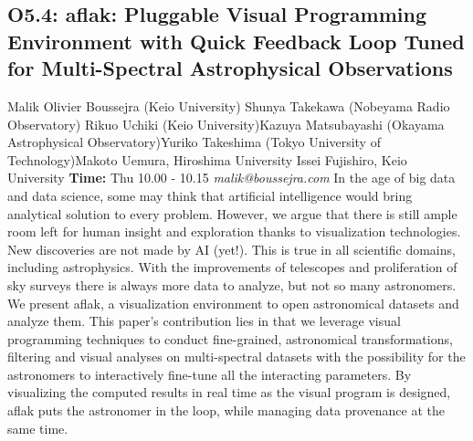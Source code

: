 \documentclass{report}
\begin{document}
\subsection*{O5.4: aflak: Pluggable Visual Programming Environment with Quick Feedback Loop Tuned for Multi-Spectral Astrophysical Observations}
\bigskip
Malik Olivier Boussejra (Keio University) \newline Shunya Takekawa (Nobeyama Radio Observatory) \newline  Rikuo Uchiki (Keio University)\newline  Kazuya Matsubayashi (Okayama Astrophysical Observatory)\newline Yuriko Takeshima (Tokyo University of Technology)\newline  Makoto Uemura, Hiroshima University
Issei Fujishiro, Keio University\newline\newline
{\bf Time:} Thu 10.00 - 10.15\newline
\newline
{\it malik@boussejra.com}\newline
\newline\newline
In the age of big data and data science, some may think that artificial
intelligence would bring analytical solution to every problem. However, we argue that there is still ample room left for human insight
and exploration thanks to visualization technologies. New discoveries are not made by AI (yet!). This is true in all scientific domains,
including astrophysics. With the improvements of telescopes and
proliferation of sky surveys there is always more data to analyze,
but not so many astronomers. We present aflak, a visualization
environment to open astronomical datasets and analyze them. This
paper’s contribution lies in that we leverage visual programming
techniques to conduct fine-grained, astronomical transformations,
filtering and visual analyses on multi-spectral datasets with the possibility for the astronomers to interactively fine-tune all the interacting
parameters. By visualizing the computed results in real time as the
visual program is designed, aflak puts the astronomer in the loop,
while managing data provenance at the same time.\newline
\newpage
\end{document}
